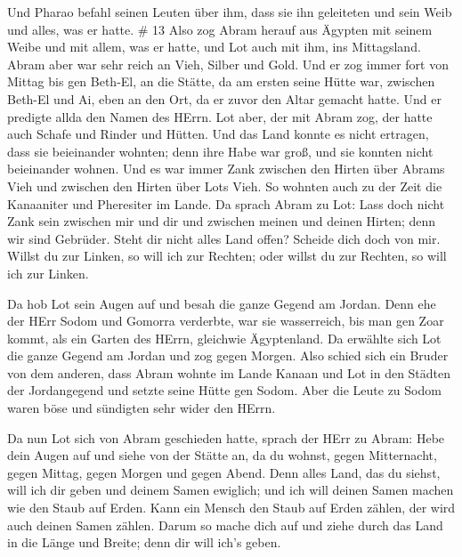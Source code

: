  Und Pharao befahl seinen Leuten über ihm, dass sie ihn
geleiteten und sein Weib und alles, was er hatte. \# 13 
Also zog Abram herauf aus Ägypten mit seinem Weibe und mit allem, was er
hatte, und Lot auch mit ihm, ins Mittagsland.  Abram aber
war sehr reich an Vieh, Silber und Gold.  Und er zog immer
fort von Mittag bis gen Beth-El, an die Stätte, da am ersten seine Hütte
war, zwischen Beth-El und Ai,  eben an den Ort, da er zuvor
den Altar gemacht hatte. Und er predigte allda den Namen des HErrn.
 Lot aber, der mit Abram zog, der hatte auch Schafe und
Rinder und Hütten.  Und das Land konnte es nicht ertragen,
dass sie beieinander wohnten; denn ihre Habe war groß, und sie konnten
nicht beieinander wohnen.  Und es war immer Zank zwischen
den Hirten über Abrams Vieh und zwischen den Hirten über Lots Vieh. So
wohnten auch zu der Zeit die Kanaaniter und Pheresiter im Lande.
 Da sprach Abram zu Lot: Lass doch nicht Zank sein zwischen
mir und dir und zwischen meinen und deinen Hirten; denn wir sind
Gebrüder.  Steht dir nicht alles Land offen? Scheide dich
doch von mir. Willst du zur Linken, so will ich zur Rechten; oder willst
du zur Rechten, so will ich zur Linken.

 Da hob Lot sein Augen auf und besah die ganze Gegend am
Jordan. Denn ehe der HErr Sodom und Gomorra verderbte, war sie
wasserreich, bis man gen Zoar kommt, als ein Garten des HErrn, gleichwie
Ägyptenland.  Da erwählte sich Lot die ganze Gegend am
Jordan und zog gegen Morgen. Also schied sich ein Bruder von dem
anderen,  dass Abram wohnte im Lande Kanaan und Lot in den
Städten der Jordangegend und setzte seine Hütte gen Sodom. 
Aber die Leute zu Sodom waren böse und sündigten sehr wider den HErrn.

 Da nun Lot sich von Abram geschieden hatte, sprach der
HErr zu Abram: Hebe dein Augen auf und siehe von der Stätte an, da du
wohnst, gegen Mitternacht, gegen Mittag, gegen Morgen und gegen Abend.
 Denn alles Land, das du siehst, will ich dir geben und
deinem Samen ewiglich;  und ich will deinen Samen machen
wie den Staub auf Erden. Kann ein Mensch den Staub auf Erden zählen, der
wird auch deinen Samen zählen.  Darum so mache dich auf und
ziehe durch das Land in die Länge und Breite; denn dir will ich's geben.

